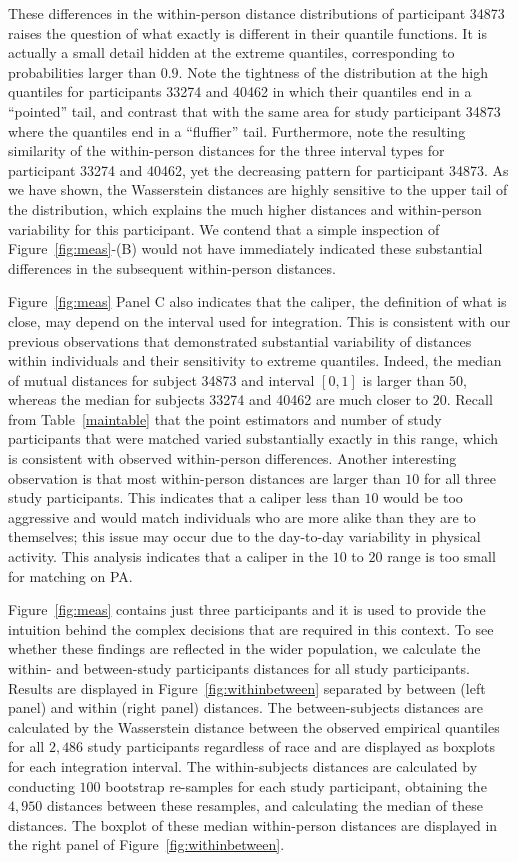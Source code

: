 These differences in the within-person distance distributions of participant 34873 raises the question of what exactly is different in their quantile functions. It is actually a small detail hidden at the extreme quantiles, corresponding to probabilities larger than $0.9$. Note the tightness of the distribution at the high quantiles for participants 33274 and 40462 in which their quantiles end in a ``pointed'' tail, and contrast that with the same area for study participant 34873 where the quantiles end in a ``fluffier'' tail. Furthermore, note the resulting similarity of the within-person distances for the three interval types for participant 33274 and 40462, yet the decreasing pattern for participant 34873. As we have shown, the Wasserstein distances are highly sensitive to the upper tail of the distribution, which explains the much higher distances and within-person variability for this participant. We contend that a simple inspection of Figure~\ref{fig:meas}-(B) would not have immediately indicated these substantial differences in the subsequent within-person distances. 


Figure~\ref{fig:meas} Panel C also indicates that the caliper, the definition of what is close, may depend on the interval used for integration. This is consistent with our previous observations that demonstrated substantial variability of distances within individuals and their sensitivity to extreme quantiles. Indeed, the median of mutual distances for subject 34873 and interval $[0,1]$ is larger than $50$, whereas the median for subjects 33274 and 40462 are much closer to $20$. Recall from Table~\ref{maintable} that the point estimators and number of study participants that were matched varied substantially exactly in this range, which is consistent with observed within-person differences. Another interesting observation is that most within-person distances are larger than $10$ for all three study participants. This indicates that a caliper less than $10$ would be too aggressive and would match individuals who are more alike than they are to themselves; this issue may occur due to the day-to-day variability in physical activity. This analysis indicates that a caliper in the $10$ to $20$ range is too small for matching on PA.  


Figure~\ref{fig:meas} contains just three participants and it is used to provide the intuition behind the complex decisions that are required in this context. To see whether these findings are reflected in the wider population, we calculate the within- and between-study participants distances for all study participants. Results are displayed in Figure~\ref{fig:withinbetween} separated by between (left panel) and within (right panel) distances. The between-subjects distances are calculated by the Wasserstein distance between the observed empirical quantiles for all $2{,}486$ study participants regardless of race and are displayed as boxplots for each integration interval. The within-subjects distances are calculated by conducting $100$ bootstrap re-samples for each study participant, obtaining the $4{,}950$ distances between these resamples, and calculating the median of these distances. The boxplot of these median within-person distances are displayed in the right panel of Figure~\ref{fig:withinbetween}. 


